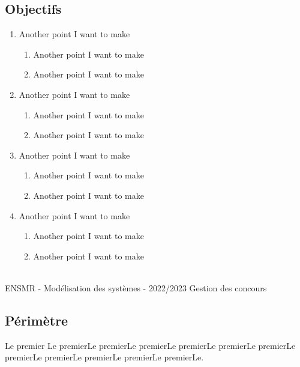 \subsection{Objectifs}
\setlength{\parindent}{5ex}
\begin{enumerate}
  \item Another point I want to make
        \begin{enumerate}
          \item Another point I want to make
          \item Another point I want to make
        \end{enumerate}
  \item Another point I want to make
        \begin{enumerate}
          \item Another point I want to make
          \item Another point I want to make
        \end{enumerate}
  \item Another point I want to make
        \begin{enumerate}
          \item Another point I want to make
          \item Another point I want to make
        \end{enumerate}
  \item Another point I want to make
        \begin{enumerate}
          \item Another point I want to make
          \item Another point I want to make
        \end{enumerate}
\end{enumerate}\vfill

\noindent\makebox[\linewidth]{\rule{.8\paperwidth}{.6pt}}\\[0.2cm]
ENSMR - Modélisation des systèmes - 2022/2023 \hfill Gestion des concours
\noindent\makebox[\linewidth]{\rule{.8\paperwidth}{.6pt}}
\newpage


\subsection{Périmètre}
\setlength{\parindent}{5ex}
Le premier Le premierLe premierLe premierLe premierLe premierLe premierLe premierLe premierLe premierLe premierLe premierLe.

